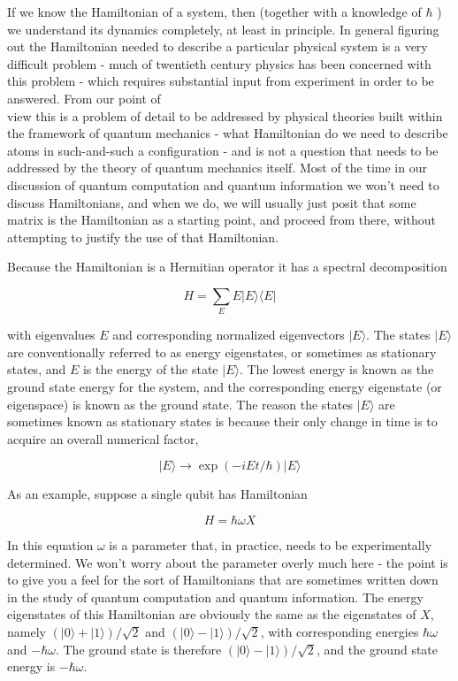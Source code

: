 \documentclass[10pt]{article}
\begin{document}
If we know the Hamiltonian of a system, then (together with a knowledge of $\hbar$ ) we understand its dynamics completely, at least in principle. In general figuring out the Hamiltonian needed to describe a particular physical system is a very difficult problem - much of twentieth century physics has been concerned with this problem - which requires substantial input from experiment in order to be answered. From our point of\\
view this is a problem of detail to be addressed by physical theories built within the framework of quantum mechanics - what Hamiltonian do we need to describe atoms in such-and-such a configuration - and is not a question that needs to be addressed by the theory of quantum mechanics itself. Most of the time in our discussion of quantum computation and quantum information we won't need to discuss Hamiltonians, and when we do, we will usually just posit that some matrix is the Hamiltonian as a starting point, and proceed from there, without attempting to justify the use of that Hamiltonian.

Because the Hamiltonian is a Hermitian operator it has a spectral decomposition


\begin{equation*}
H=\sum_{E} E|E\rangle\langle E| \tag{2.87}
\end{equation*}


with eigenvalues $E$ and corresponding normalized eigenvectors $|E\rangle$. The states $|E\rangle$ are conventionally referred to as energy eigenstates, or sometimes as stationary states, and $E$ is the energy of the state $|E\rangle$. The lowest energy is known as the ground state energy for the system, and the corresponding energy eigenstate (or eigenspace) is known as the ground state. The reason the states $|E\rangle$ are sometimes known as stationary states is because their only change in time is to acquire an overall numerical factor,


\begin{equation*}
|E\rangle \rightarrow \exp (-i E t / \hbar)|E\rangle \tag{2.88}
\end{equation*}


As an example, suppose a single qubit has Hamiltonian


\begin{equation*}
H=\hbar \omega X \tag{2.89}
\end{equation*}


In this equation $\omega$ is a parameter that, in practice, needs to be experimentally determined. We won't worry about the parameter overly much here - the point is to give you a feel for the sort of Hamiltonians that are sometimes written down in the study of quantum computation and quantum information. The energy eigenstates of this Hamiltonian are obviously the same as the eigenstates of $X$, namely $(|0\rangle+|1\rangle) / \sqrt{2}$ and $(|0\rangle-|1\rangle) / \sqrt{2}$, with corresponding energies $\hbar \omega$ and $-\hbar \omega$. The ground state is therefore $(|0\rangle-|1\rangle) / \sqrt{2}$, and the ground state energy is $-\hbar \omega$.
\end{document}
